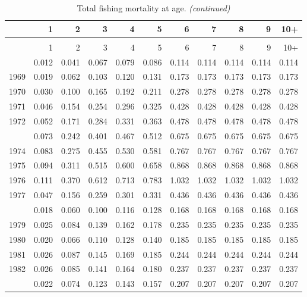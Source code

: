 \documentclass[
]{article}
\begin{document}
\begin{longtable}[t]{lrrrrrrrrrr}
\caption{\label{tab:FAA-tot-table}Total fishing mortality at age.}\\
\toprule
  & 1 & 2 & 3 & 4 & 5 & 6 & 7 & 8 & 9 & 10+\\
\midrule
\endfirsthead
\caption[]{Total fishing mortality at age. \textit{(continued)}}\\
\toprule
  & 1 & 2 & 3 & 4 & 5 & 6 & 7 & 8 & 9 & 10+\\
\midrule
\endhead

\endfoot
\bottomrule
\endlastfoot
1968 & 0.012 & 0.041 & 0.067 & 0.079 & 0.086 & 0.114 & 0.114 & 0.114 & 0.114 & 0.114\\
1969 & 0.019 & 0.062 & 0.103 & 0.120 & 0.131 & 0.173 & 0.173 & 0.173 & 0.173 & 0.173\\
1970 & 0.030 & 0.100 & 0.165 & 0.192 & 0.211 & 0.278 & 0.278 & 0.278 & 0.278 & 0.278\\
1971 & 0.046 & 0.154 & 0.254 & 0.296 & 0.325 & 0.428 & 0.428 & 0.428 & 0.428 & 0.428\\
1972 & 0.052 & 0.171 & 0.284 & 0.331 & 0.363 & 0.478 & 0.478 & 0.478 & 0.478 & 0.478\\
\addlinespace
1973 & 0.073 & 0.242 & 0.401 & 0.467 & 0.512 & 0.675 & 0.675 & 0.675 & 0.675 & 0.675\\
1974 & 0.083 & 0.275 & 0.455 & 0.530 & 0.581 & 0.767 & 0.767 & 0.767 & 0.767 & 0.767\\
1975 & 0.094 & 0.311 & 0.515 & 0.600 & 0.658 & 0.868 & 0.868 & 0.868 & 0.868 & 0.868\\
1976 & 0.111 & 0.370 & 0.612 & 0.713 & 0.783 & 1.032 & 1.032 & 1.032 & 1.032 & 1.032\\
1977 & 0.047 & 0.156 & 0.259 & 0.301 & 0.331 & 0.436 & 0.436 & 0.436 & 0.436 & 0.436\\
\addlinespace
1978 & 0.018 & 0.060 & 0.100 & 0.116 & 0.128 & 0.168 & 0.168 & 0.168 & 0.168 & 0.168\\
1979 & 0.025 & 0.084 & 0.139 & 0.162 & 0.178 & 0.235 & 0.235 & 0.235 & 0.235 & 0.235\\
1980 & 0.020 & 0.066 & 0.110 & 0.128 & 0.140 & 0.185 & 0.185 & 0.185 & 0.185 & 0.185\\
1981 & 0.026 & 0.087 & 0.145 & 0.169 & 0.185 & 0.244 & 0.244 & 0.244 & 0.244 & 0.244\\
1982 & 0.026 & 0.085 & 0.141 & 0.164 & 0.180 & 0.237 & 0.237 & 0.237 & 0.237 & 0.237\\
\addlinespace
1983 & 0.022 & 0.074 & 0.123 & 0.143 & 0.157 & 0.207 & 0.207 & 0.207 & 0.207 & 0.207\\

\end{longtable}
\end{document}
